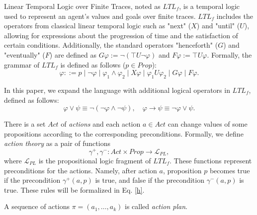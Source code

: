 \documentclass[]{jair}
\begin{document}
Linear Temporal Logic over Finite Traces, noted as \( LTL_{f} \), is a temporal logic used to represent an agent's values and goals over finite traces. \( LTL_{f} \) includes the operators from classical linear temporal logic such as "next" (\( X \)) and "until" (\( U \)), allowing for expressions about the progression of time and the satisfaction of certain conditions. Additionally, the standard operators "henceforth" (\( G \)) and "eventually" (\( F \)) are defined as \( G\varphi := \neg(\top U \neg \varphi) \) and \( F\varphi := \top U \varphi \). Formally, the grammar of \( LTL_{f} \) is defined as follows ($p\in Prop$):
\begin{equation}
    \varphi ::= p \mid \neg \varphi \mid \varphi_1 \land \varphi_2 \mid X \varphi \mid \varphi_1 U \varphi_2 \mid G \varphi \mid F \varphi.
\end{equation}

In this paper, we expand the language with additional logical operators in $LTL_f$, defined as follows:
\begin{equation}
\varphi \lor \psi \equiv \neg(\neg \varphi \land \neg \psi), \quad
\varphi \to \psi \equiv \neg \varphi \lor \psi.
\end{equation}

There is a set $Act$ of {\it actions} and each action $a\in Act$ can change values of some propositions
according to the corresponding preconditions. Formally, we define {\it action theory} as a pair of functions
\begin{equation}\gamma^+, \gamma^- : Act \times Prop \to \mathcal{L}_{PL},\end{equation}
where $\mathcal{L}_{PL}$ is the propositional logic fragment of $LTL_f$.
These functions represent preconditions for the actions. Namely,
after action $a$, proposition $p$ becomes true if the precondition $\gamma^+(a, p)$ is true,
and false if the precondition $\gamma^-(a, p)$ is true. These rules will be formalized in Eq. \eqref{h}.

A sequence of actions $\pi = (a_1, \dots, a_k)$ is called {\it action plan}.
\end{document}
